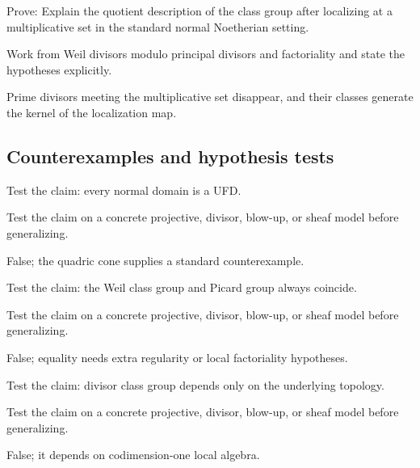 \begin{exercise}\label{exr:vi41-expand-09}
Prove: Explain the quotient description of the class group after localizing at a multiplicative set in the standard normal Noetherian setting.
\end{exercise}
\begin{hint}
Work from Weil divisors modulo principal divisors and factoriality and state the hypotheses explicitly.
\end{hint}
\begin{solution}
Prime divisors meeting the multiplicative set disappear, and their classes generate the kernel of the localization map.
\end{solution}

\subsection*{Counterexamples and hypothesis tests}

\begin{exercise}\label{exr:vi41-expand-10}
Test the claim: every normal domain is a UFD.
\end{exercise}
\begin{hint}
Test the claim on a concrete projective, divisor, blow-up, or sheaf model before generalizing.
\end{hint}
\begin{solution}
False; the quadric cone supplies a standard counterexample.
\end{solution}

\begin{exercise}\label{exr:vi41-expand-11}
Test the claim: the Weil class group and Picard group always coincide.
\end{exercise}
\begin{hint}
Test the claim on a concrete projective, divisor, blow-up, or sheaf model before generalizing.
\end{hint}
\begin{solution}
False; equality needs extra regularity or local factoriality hypotheses.
\end{solution}

\begin{exercise}\label{exr:vi41-expand-12}
Test the claim: divisor class group depends only on the underlying topology.
\end{exercise}
\begin{hint}
Test the claim on a concrete projective, divisor, blow-up, or sheaf model before generalizing.
\end{hint}
\begin{solution}
False; it depends on codimension-one local algebra.
\end{solution}

